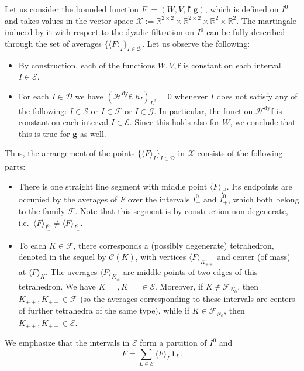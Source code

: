 \documentclass{amsart}
\newcommand{\R}{\mathbb{R}}
\newcommand{\cD}{\mathcal{D}}
\theoremstyle{definition}
\theoremstyle{remark}
\begin{document}
Let us consider the bounded function $F:=(W,V,\mathbf{f},\mathbf{g})$, which is defined on $I^{0}$ and takes values in the vector space $\mathscr{X}:=\R^{2\times 2}\times\R^{2\times 2}\times\R^2\times\R^2$. The martingale induced by it with respect to the dyadic filtration on $I^{0}$ can be fully described through the set of averages $\{\langle F\rangle_{I}\}_{I\in\cD}$. Let us observe the following:
\begin{itemize}
\item By construction, each of the functions $W,V,\mathbf{f}$ is constant on each interval $I\in\mathscr{E}$.

\item For each $I\in\cD$ we have $(\mathcal{H}^{\mathrm{dy}}\mathbf{f},h_{I})_{L^2}=0$ whenever $I$ does not satisfy any of the following: $I\in\mathscr{S}$ or $I\in\mathscr{F}$ or $I\in\mathscr{G}$. In particular, the function $\mathcal{H}^{\mathrm{dy}}\mathbf{f}$ is constant on each interval $I\in\mathscr{E}$. Since this holds also for $W$, we conclude that this is true for $\mathbf{g}$ as well.
\end{itemize}
 Thus, the arrangement of the points $\{\langle F\rangle_{I}\}_{I\in\cD}$ in $\mathscr{X}$ consists of the following parts:
\begin{itemize}
    \item There is one straight line segment with middle point $\langle F\rangle_{I^{0}}$. Its endpoints are occupied by the averages of $F$ over the intervals $I^{0}_{+}$ and $I^{0}_{+}$, which both belong to the family $\mathscr{F}$. Note that this segment is by construction non-degenerate, i.e.~$\langle F\rangle_{I^{0}_{+}}\neq\langle F\rangle_{I^{0}_{-}}$.

    \item To each $K\in\mathscr{F}$, there corresponds a (possibly degenerate) tetrahedron, denoted in the sequel by $\mathscr{C}(K)$, with vertices $\langle F\rangle_{K_{\pm\pm}}$ and center (of mass) at $\langle F\rangle_{K}$. The averages $\langle F\rangle_{K_{\pm}}$ are middle points of two edges of this tetrahedron. We have $K_{--},K_{-+}\in\mathscr{E}$. Moreover, if $K\notin\mathscr{F}_{N_0}$, then $K_{++},K_{+-}\in\mathscr{F}$ (so the averages corresponding to these intervals are centers of further tetrahedra of the same type), while if $K\in\mathscr{F}_{N_0}$, then $K_{++},K_{+-}\in\mathscr{E}$.
\end{itemize}
We emphasize that the intervals in $\mathscr{E}$ form a partition of $I^{0}$ and
\begin{equation}
    \label{eq:F_decomposition}
    F=\sum_{L\in\mathscr{E}}\langle F\rangle_{L}\mathbf{1}_{L}.
\end{equation}
\end{document}
